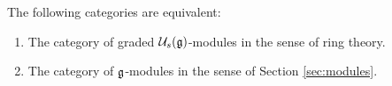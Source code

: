 \begin{proposition}
  The following categories are equivalent:
  \begin{enumerate}
  \item The category of graded $\mathcal{U}_s(\mathfrak{g})$-modules in the sense of ring theory.
  \item The category of $\mathfrak{g}$-modules in the sense of Section \ref{sec:modules}.
\end{enumerate}
\end{proposition}

